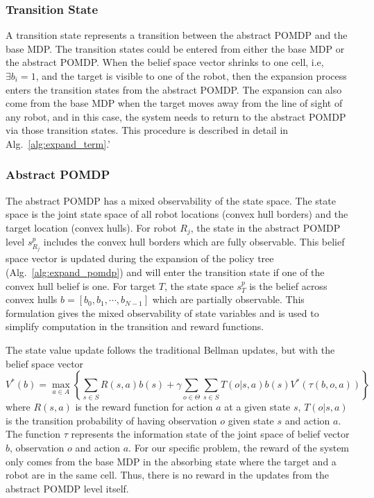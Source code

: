 \documentclass[../main.tex]{subfiles}
\begin{document}
\subsubsection{Transition State}
A transition state represents a transition between the abstract POMDP and the base MDP.
The transition states could be entered from either the base MDP or the abstract POMDP. When the belief space vector shrinks to one cell, i.e, $\exists b_i = 1$, and the target is visible to one of the robot, then the expansion process enters the transition states from the abstract POMDP. The expansion can also come from the base MDP when the target moves away from the line of sight of any robot, and in this case, the system needs to return to the abstract POMDP via those transition states. This procedure is described in detail in Alg.~\ref{alg:expand_term}.'



\subsubsection{Abstract POMDP}
The abstract POMDP has a mixed observability of the state space. The state space is the joint state space of all robot locations (convex hull borders) and the target location (convex hulls).
For robot $R_j$, the state in the abstract POMDP level $s_{R_j}^p$
includes the convex hull borders which are fully observable. This belief space vector is updated during the expansion of the policy tree (Alg.~\ref{alg:expand_pomdp}) and will enter the transition state if one of the convex hull belief is one. For target $T$, the state space $s_T^p$ is the belief across convex hulls $b = [b_0, b_1, \cdots, b_{N-1}]$ which are partially observable. This formulation gives the mixed observability of state variables and is used to simplify computation in the transition and reward functions.

The state value update follows the traditional Bellman updates, but with the belief space vector~\cite{hauskrecht2000value}
\begin{equation}
    V^* ( b ) = \max _ { a \in A } \left\{ \sum _ { s \in S } R ( s ,a ) b ( s ) + \gamma \sum _ { o \in \Theta } \sum _ { s \in S } T ( o | s ,a ) b ( s ) V^* ( \tau ( b ,o ,a ) ) \right\}
\end{equation}
where $R(s, a)$ is the reward function for action $a$ at a given state $s$, $T ( o | s ,a )$ is the transition probability of having observation $o$ given state $s$ and action $a$. The function $\tau$ represents the information state of the joint space of belief vector $b$, observation $o$ and action $a$.
For our specific problem, the reward of the system only comes from the base MDP in the absorbing state where the target and a robot are in the same cell. Thus, there is no reward in the updates from the abstract POMDP level itself. 
\end{document}
